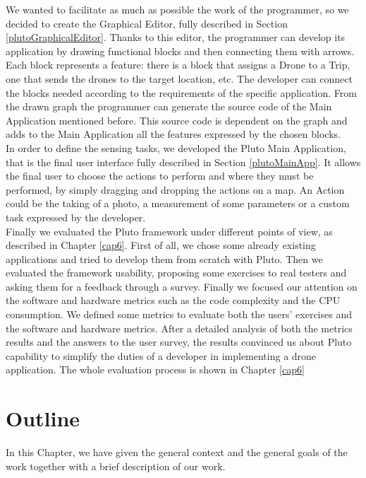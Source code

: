 We wanted to facilitate as much as possible the work of the programmer, so we decided to create the Graphical Editor, fully described in Section \ref{plutoGraphicalEditor}.
Thanks to this editor, the programmer can develop its application by drawing functional blocks and then connecting them with arrows.
Each block represents a feature: there is a block that assigns a Drone to a Trip, one that sends the drones to the target location, etc.
The developer can connect the blocks needed according to the requirements of the specific application.
From the drawn graph the programmer can generate the source code of the Main Application mentioned before. This source code is dependent on the graph and adds to the Main Application all the features expressed by the chosen blocks.
\\

In order to define the sensing tasks, we developed the Pluto Main Application, that is the final user interface fully described in Section \ref{plutoMainApp}.
It allows the final user to choose the actions to perform and where they must be performed, by simply dragging and dropping the actions on a map. 
An Action could be the taking of a photo, a measurement of some parameters or a custom task expressed by the developer.
\\

Finally we evaluated the Pluto framework under different points of view, as described in Chapter \ref{cap6}. 
First of all, we chose some already existing applications and tried to develop them from scratch with Pluto.
Then we evaluated the framework usability, proposing some exercises to real testers and asking them for a feedback through a survey.
Finally we focused our attention on the software and hardware metrics such as the code complexity and the CPU consumption. 
We defined some metrics to evaluate both the users' exercises and the software and hardware metrics.
After a detailed analysis of both the metrics results and the answers to the user survey,
the results convinced us about Pluto capability to simplify the duties of a developer in implementing a drone application.
The whole evaluation process is shown in Chapter \ref{cap6}


\section{Outline}

In this Chapter, we have given the general context and the general goals of the work together with a brief description of our work.
\\

